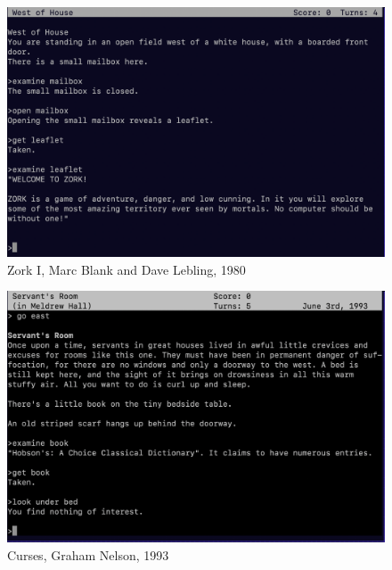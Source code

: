 \begin{frame}[b]
    \begin{figure}
        \centering
        \includegraphics[width=\textwidth,keepaspectratio]{../images/zork1.png}
        \caption*{Zork I, Marc Blank and Dave Lebling, 1980}
    \end{figure}
\end{frame}

\begin{frame}[b]
    \begin{figure}
        \centering
        \includegraphics[width=\textwidth,keepaspectratio]{../images/curses.png}
        \caption*{Curses, Graham Nelson, 1993}
    \end{figure}
\end{frame}

